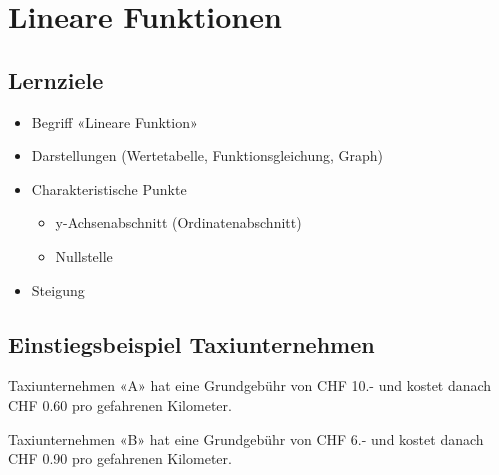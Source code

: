 
\section{Lineare Funktionen}
\label{lineare_funktionen}
\subsection*{Lernziele}

\begin{itemize}
\item Begriff «Lineare Funktion»
\item Darstellungen (Wertetabelle, Funktionsgleichung, Graph)
\item Charakteristische Punkte
  \begin{itemize}
  \item
    y-Achsenabschnitt (Ordinatenabschnitt)
  \item Nullstelle
  \end{itemize}
\item Steigung
\end{itemize}





\newpage

\subsection{Einstiegsbeispiel Taxiunternehmen}
Taxiunternehmen «A» hat eine Grundgebühr von CHF 10.- und kostet
danach CHF 0.60 pro gefahrenen Kilometer.

Taxiunternehmen «B» hat eine Grundgebühr von CHF 6.- und kostet
danach CHF 0.90 pro gefahrenen Kilometer.

